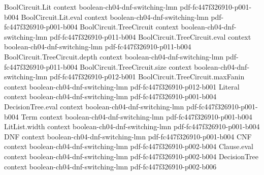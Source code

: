 \begin{theorem}
\label{LMN.circuit_reduction_core}
\leanok
{}
\proofstep
  {BoolCircuit.Lit}
  {context}
  {boolean-ch04-dnf-switching-lmn}
  {pdf-fc447f326910-p001-b004}
\proofstep
  {BoolCircuit.Lit.eval}
  {context}
  {boolean-ch04-dnf-switching-lmn}
  {pdf-fc447f326910-p001-b004}
\proofstep
  {BoolCircuit.TreeCircuit}
  {context}
  {boolean-ch04-dnf-switching-lmn}
  {pdf-fc447f326910-p011-b004}
\proofstep
  {BoolCircuit.TreeCircuit.eval}
  {context}
  {boolean-ch04-dnf-switching-lmn}
  {pdf-fc447f326910-p011-b004}
\proofstep
  {BoolCircuit.TreeCircuit.depth}
  {context}
  {boolean-ch04-dnf-switching-lmn}
  {pdf-fc447f326910-p011-b004}
\proofstep
  {BoolCircuit.TreeCircuit.size}
  {context}
  {boolean-ch04-dnf-switching-lmn}
  {pdf-fc447f326910-p012-b001}
\proofstep
  {BoolCircuit.TreeCircuit.maxFanin}
  {context}
  {boolean-ch04-dnf-switching-lmn}
  {pdf-fc447f326910-p012-b001}
\proofstep
  {Literal}
  {context}
  {boolean-ch04-dnf-switching-lmn}
  {pdf-fc447f326910-p001-b004}
\proofstep
  {DecisionTree.eval}
  {context}
  {boolean-ch04-dnf-switching-lmn}
  {pdf-fc447f326910-p001-b004}
\proofstep
  {Term}
  {context}
  {boolean-ch04-dnf-switching-lmn}
  {pdf-fc447f326910-p001-b004}
\proofstep
  {LitList.width}
  {context}
  {boolean-ch04-dnf-switching-lmn}
  {pdf-fc447f326910-p001-b004}
\proofstep
  {DNF}
  {context}
  {boolean-ch04-dnf-switching-lmn}
  {pdf-fc447f326910-p001-b004}
\proofstep
  {CNF}
  {context}
  {boolean-ch04-dnf-switching-lmn}
  {pdf-fc447f326910-p002-b004}
\proofstep
  {Clause.eval}
  {context}
  {boolean-ch04-dnf-switching-lmn}
  {pdf-fc447f326910-p002-b004}
\proofstep
  {DecisionTree}
  {context}
  {boolean-ch04-dnf-switching-lmn}
  {pdf-fc447f326910-p002-b006}

\end{theorem}

